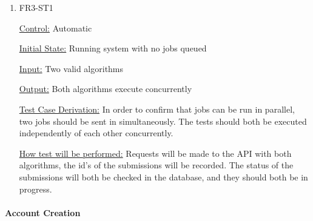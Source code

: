 \documentclass[12pt, titlepage]{article}
\begin{document}
\begin{enumerate}
					
\item{FR3-ST1\\}

\underline{Control:} Automatic 

\underline{Initial State:} Running system with no jobs queued

\underline{Input:} Two valid algorithms

\underline{Output:} Both algorithms execute concurrently

\underline{Test Case Derivation:} In order to confirm that jobs can be run in parallel, two jobs should be sent in simultaneously. The tests should both be executed independently of each other concurrently. 

\underline{How test will be performed:} Requests will be made to the API with both algorithms, the id’s of the submissions will be recorded. The status of the submissions will both be checked in the database, and they should both be in progress.

\end{enumerate}

\paragraph{Account Creation}
\end{document}
